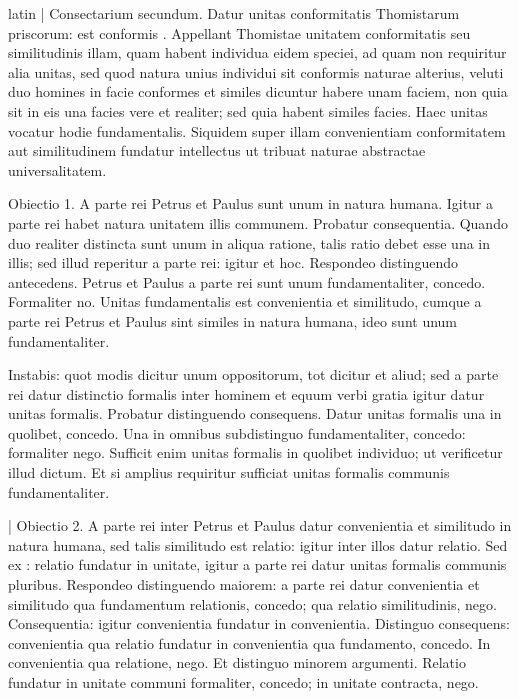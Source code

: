 \begin{otherlanguage*}{latin}
\pstart
 \textnormal{|} Consectarium secundum. Datur unitas conformitatis Thomistarum priscorum: est conformis . Appellant Thomistae unitatem conformitatis seu similitudinis illam, quam habent individua eidem speciei, ad quam non requiritur alia unitas, sed quod natura unius individui sit conformis naturae alterius, veluti duo homines in facie conformes et similes dicuntur habere unam faciem, non quia sit in eis una facies vere et realiter; sed quia habent similes facies. Haec unitas vocatur hodie fundamentalis. Siquidem super illam convenientiam conformitatem aut similitudinem fundatur intellectus ut tribuat naturae abstractae universalitatem. 
\pend

\pstart
 Obiectio 1. A parte rei Petrus et Paulus sunt unum in natura humana. Igitur a parte rei habet natura unitatem illis communem. Probatur consequentia. Quando duo realiter distincta sunt unum in aliqua ratione, talis ratio debet esse una in illis; sed illud reperitur a parte rei: igitur et hoc. Respondeo distinguendo antecedens. Petrus et Paulus a parte rei sunt unum fundamentaliter, concedo. Formaliter no. Unitas fundamentalis est convenientia et similitudo, cumque a parte rei Petrus et Paulus sint similes in natura humana, ideo sunt unum fundamentaliter. 
\pend

\pstart
 Instabis: quot modis dicitur unum oppositorum, tot dicitur et aliud; sed a parte rei datur distinctio formalis inter hominem et equum verbi gratia igitur datur unitas formalis. Probatur distinguendo consequens. Datur unitas formalis una in quolibet, concedo. Una in omnibus subdistinguo fundamentaliter, concedo: formaliter nego. Sufficit enim unitas formalis in quolibet individuo; ut verificetur illud dictum. Et si amplius requiritur sufficiat unitas formalis communis fundamentaliter. 
\pend

\pstart
 \textnormal{|}  Obiectio 2. A parte rei inter Petrus et Paulus datur convenientia et similitudo in natura humana, sed talis similitudo est relatio: igitur inter illos datur relatio. Sed ex  : relatio fundatur in unitate, igitur a parte rei datur unitas formalis communis pluribus. Respondeo distinguendo maiorem: a parte rei datur convenientia et similitudo qua fundamentum relationis, concedo; qua relatio similitudinis, nego. Consequentia: igitur convenientia fundatur in convenientia. Distinguo consequens: convenientia qua relatio fundatur in convenientia qua fundamento, concedo. In convenientia qua relatione, nego. Et distinguo minorem argumenti. Relatio fundatur in unitate communi formaliter, concedo; in unitate contracta, nego. 
\pend


\end{otherlanguage*}
